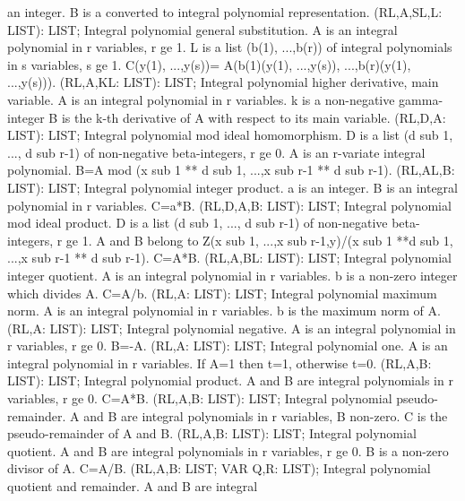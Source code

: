an integer. B is a converted to integral polynomial representation. \ecom 
{} (RL,A,SL,L: LIST): LIST; \eproc
\bcom Integral polynomial general substitution. A is an integral
polynomial in r variables, r ge 1.  L is a list (b(1), ...,b(r)) of
integral polynomials in s variables, s ge 1.  C(y(1), ...,y(s))=
A(b(1)(y(1), ...,y(s)), ...,b(r)(y(1), ...,y(s))). \ecom 
{} (RL,A,KL: LIST): LIST; \eproc
\bcom Integral polynomial higher derivative, main variable. A is an
integral polynomial in r variables.  k is a non-negative
gamma-integer B is the k-th derivative of A with respect to its main
variable. \ecom 
{} (RL,D,A: LIST): LIST; \eproc
\bcom Integral polynomial mod ideal homomorphism. D is a list (d sub 1, ...,
d sub r-1) of non-negative beta-integers, r ge 0.  A is an r-variate 
integral polynomial.  B=A mod (x sub 1 ** d sub 1, ...,x sub
r-1 ** d sub r-1). \ecom 
{} (RL,AL,B: LIST): LIST; \eproc
\bcom Integral polynomial integer product. a is an integer. B is an
integral polynomial in r variables. C=a*B. \ecom 
{} (RL,D,A,B: LIST): LIST; \eproc
\bcom Integral polynomial mod ideal product. D is a list (d sub 1, ...,
d sub r-1) of non-negative beta-integers, r ge 1.  A and B belong to
Z(x sub 1, ...,x sub r-1,y)/(x sub 1 **d sub 1, ...,x sub r-1 ** d
sub r-1). C=A*B. \ecom 
{} (RL,A,BL: LIST): LIST; \eproc
\bcom Integral polynomial integer quotient. A is an integral polynomial
in r variables. b is a non-zero integer which divides A. C=A/b. \ecom 
{} (RL,A: LIST): LIST; \eproc
\bcom Integral polynomial maximum norm. A is an integral polynomial
in r variables. b is the maximum norm of A. \ecom 
{} (RL,A: LIST): LIST; \eproc
\bcom Integral polynomial negative. A is an integral polynomial in r
variables, r ge 0. B=-A. \ecom 
{} (RL,A: LIST): LIST; \eproc
\bcom Integral polynomial one. A is an integral polynomial in r
variables. If A=1 then t=1, otherwise t=0. \ecom 
{} (RL,A,B: LIST): LIST; \eproc
\bcom Integral polynomial product. A and B are integral polynomials in r
variables, r ge 0. C=A*B. \ecom 
{} (RL,A,B: LIST): LIST; \eproc
\bcom Integral polynomial pseudo-remainder. A and B are integral
polynomials in r variables, B non-zero.  C is the pseudo-remainder
of A and B. \ecom 
{} (RL,A,B: LIST): LIST; \eproc
\bcom Integral polynomial quotient. A and B are integral polynomials in
r variables, r ge 0. B is a non-zero divisor of A. C=A/B. \ecom 
{} (RL,A,B: LIST; VAR Q,R: LIST); \eproc
\bcom Integral polynomial quotient and remainder. A and B are integral
